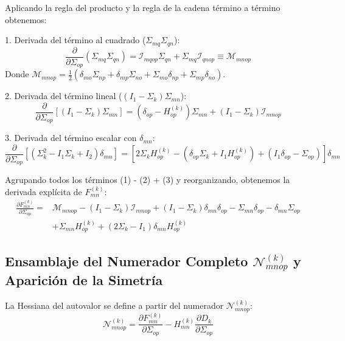 \documentclass[12pt]{article}
\begin{document}
Aplicando la regla del producto y la regla de la cadena término a término obtenemos:

1. Derivada del término al cuadrado ($\Sigma_{mq}\Sigma_{qn}$):
\begin{equation}
    \frac{\partial}{\partial \Sigma_{op}} (\Sigma_{mq}\Sigma_{qn}) = \mathcal{I}_{mqop}\Sigma_{qn} + \Sigma_{mq}\mathcal{I}_{qnop} \equiv \mathcal{M}_{mnop}
\end{equation}
Donde $\mathcal{M}_{mnop} = \frac{1}{2}(\delta_{mo}\Sigma_{np} + \delta_{mp}\Sigma_{no} + \Sigma_{mo}\delta_{np} + \Sigma_{mp}\delta_{no})$.

2. Derivada del término lineal ($(I_1 - \Sigma_k)\Sigma_{mn}$):
\begin{equation}
    \frac{\partial}{\partial \Sigma_{op}} \left[ (I_1 - \Sigma_k)\Sigma_{mn} \right] = (\delta_{op} - H_{op}^{(k)})\Sigma_{mn} + (I_1 - \Sigma_k)\mathcal{I}_{mnop}
\end{equation}

3. Derivada del término escalar con $\delta_{mn}$:
\begin{equation}
    \frac{\partial}{\partial \Sigma_{op}} \left[ (\Sigma_k^2 - I_1\Sigma_k + I_2)\delta_{mn} \right] = \left[ 2\Sigma_k H_{op}^{(k)} - (\delta_{op}\Sigma_k + I_1 H_{op}^{(k)}) + (I_1\delta_{op} - \Sigma_{op}) \right]\delta_{mn}
\end{equation}

Agrupando todos los términos (1) - (2) + (3) y reorganizando, obtenemos la derivada explícita de $F_{mn}^{(k)}$:
\begin{align}
    \frac{\partial F_{mn}^{(k)}}{\partial \Sigma_{op}} = & \mathcal{M}_{mnop} - (I_1 - \Sigma_k)\mathcal{I}_{mnop} + (I_1 - \Sigma_k)\delta_{mn}\delta_{op} - \Sigma_{mn}\delta_{op} - \delta_{mn}\Sigma_{op} \nonumber \\
    & + \Sigma_{mn}H^{(k)}_{op} + (2\Sigma_k - I_1)\delta_{mn}H^{(k)}_{op} \label{eq:dF_dSigma}
\end{align}

\subsection{Ensamblaje del Numerador Completo $\mathcal{N}_{mnop}^{(k)}$ y Aparición de la Simetría}
La Hessiana del autovalor se define a partir del numerador $\mathcal{N}_{mnop}^{(k)}$:
\begin{equation}
    \mathcal{N}_{mnop}^{(k)} = \frac{\partial F_{mn}^{(k)}}{\partial \Sigma_{op}} - H_{mn}^{(k)} \frac{\partial D_k}{\partial \Sigma_{op}}
\end{equation}
\end{document}
